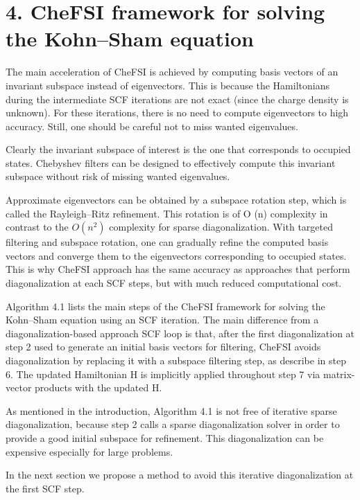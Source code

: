 \documentclass[
  10
]{article}
\begin{document}
\section{4. CheFSI framework for solving the Kohn--Sham
equation}\label{chefsi-framework-for-solving-the-kohnsham-equation}

The main acceleration of CheFSI is achieved by computing basis vectors
of an invariant subspace instead of eigenvectors. This is because the
Hamiltonians during the intermediate SCF iterations are not exact (since
the charge density is unknown). For these iterations, there is no need
to compute eigenvectors to high accuracy. Still, one should be careful
not to miss wanted eigenvalues.

Clearly the invariant subspace of interest is the one that corresponds
to occupied states. Chebyshev filters can be designed to effectively
compute this invariant subspace without risk of missing wanted
eigenvalues.

Approximate eigenvectors can be obtained by a subspace rotation step,
which is called the Rayleigh--Ritz refinement. This rotation is of O (n)
complexity in contrast to the \(O ( n ^ { 2 } )\) complexity for sparse
diagonalization. With targeted filtering and subspace rotation, one can
gradually refine the computed basis vectors and converge them to the
eigenvectors corresponding to occupied states. This is why CheFSI
approach has the same accuracy as approaches that perform
diagonalization at each SCF steps, but with much reduced computational
cost.

Algorithm 4.1 lists the main steps of the CheFSI framework for solving
the Kohn--Sham equation using an SCF iteration. The main difference from
a diagonalization-based approach SCF loop is that, after the first
diagonalization at step 2 used to generate an initial basis vectors for
filtering, CheFSI avoids diagonalization by replacing it with a subspace
filtering step, as describe in step 6. The updated Hamiltonian H is
implicitly applied throughout step 7 via matrix-vector products with the
updated H.

As mentioned in the introduction, Algorithm 4.1 is not free of iterative
sparse diagonalization, because step 2 calls a sparse diagonalization
solver in order to provide a good initial subspace for refinement. This
diagonalization can be expensive especially for large problems.

In the next section we propose a method to avoid this iterative
diagonalization at the first SCF step.
\end{document}
